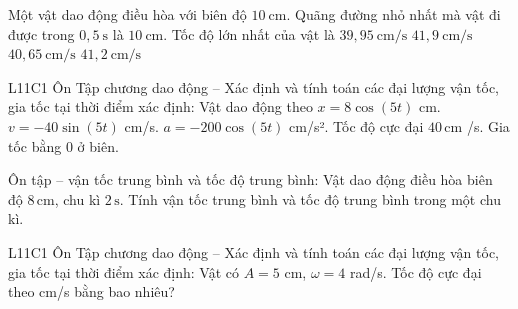 \begin{ex}
Một vật dao động điều hòa với biên độ $10\ \text{cm}$. Quãng đường nhỏ nhất mà vật đi được trong $0,5\ \text{s}$ là $10\ \text{cm}$. Tốc độ lớn nhất của vật là
\choice
{$39,95\ \text{cm/s}$}
{\True $41,9\ \text{cm/s}$}
{$40,65\ \text{cm/s}$}
{$41,2\ \text{cm/s}$}
\end{ex}

\begin{ex}
L11C1 Ôn Tập chương dao động – Xác định và tính toán các đại lượng vận tốc, gia tốc tại thời điểm xác định: Vật dao động theo $x=8\cos(5t)$ cm.
\choiceTF
{\True $v=-40\sin(5t)$ cm/s.}
{\True $a=-200\cos(5t)$ cm/s².}
{\True Tốc độ cực đại $40\,\text{cm}$ /s.}
{Gia tốc bằng 0 ở biên.}
\end{ex}

\begin{ex}
Ôn tập – vận tốc trung bình và tốc độ trung bình: Vật dao động điều hòa biên độ $8\,\text{cm}$, chu kì $2\,\text{s}$. Tính vận tốc trung bình và tốc độ trung bình trong một chu kì.
\choiceTF

\end{ex}

\begin{ex}
L11C1 Ôn Tập chương dao động – Xác định và tính toán các đại lượng vận tốc, gia tốc tại thời điểm xác định: Vật có $A=5$ cm, $\omega=4$ rad/s. Tốc độ cực đại theo cm/s bằng bao nhiêu?
\end{ex}


